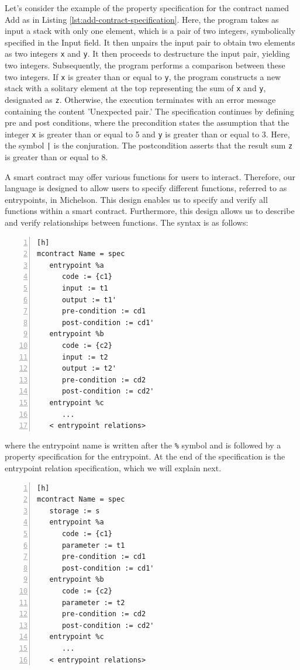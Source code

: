 \documentclass[a4paper,UKenglish,cleveref, autoref, thm-restate]{lipics-v2021}
\begin{document}
Let's consider the  example of the property specification for the contract named Add as in Listing \ref{lst:add-contract-specification}. Here, the program takes as input a stack with only one element, which is a pair of two integers, symbolically specified in the Input field. It then unpairs the input pair to obtain two elements as two integers \lstinline/x/ and \lstinline/y/.  It then proceeds to destructure the input pair, yielding two integers. Subsequently, the program performs a comparison between these two integers. If  \lstinline/x/ is greater than or equal to \lstinline/y/, the program constructs a new stack with a solitary element at the top representing the sum of  \lstinline/x/ and \lstinline/y/, designated as \lstinline/z/. Otherwise, the execution terminates with an error message containing the content 'Unexpected pair.' The specification continues by defining pre and post conditions, where the precondition states the assumption that the integer  \lstinline/x/ is greater than or equal to 5 and \lstinline/y/ is greater than or equal to 3. Here, the symbol  \lstinline/|/ is the conjuration. The postcondition asserts that the result sum \lstinline/z/ is greater than or equal to 8. 

A smart contract may offer various functions for users to interact. Therefore, our language is designed to allow users to specify different functions, referred to as entrypoints, in Michelson. This design enables us to specify and verify all functions within a smart contract. Furthermore, this design allows us to describe and verify relationships between functions.  The syntax is as follows: 
\begin{lstlisting}[float,captionpos=b,caption={Multiple entrypoint specification syntax},label={lst:multiple-entrypoint-specification},numbers=left][h]
mcontract Name = spec
   entrypoint %a 
      code := {c1}
      input := t1
      output := t1'
      pre-condition := cd1
      post-condition := cd1'
   entrypoint %b 
      code := {c2}
      input := t2
      output := t2'
      pre-condition := cd2
      post-condition := cd2'
   entrypoint %c 
      ...
   < entrypoint relations>
\end{lstlisting}
where the entrypoint name is written after the \lstinline/%/ symbol and is followed by a property specification for the entrypoint. At the end of the specification is the entrypoint relation specification, which we will explain next.

\begin{lstlisting}[float,captionpos=b,caption={Multiple entrypoint specification syntax},label={lst:multiple-entrypoint-specification},numbers=left][h]
mcontract Name = spec
   storage := s
   entrypoint %a 
      code := {c1}
      parameter := t1
      pre-condition := cd1
      post-condition := cd1'
   entrypoint %b 
      code := {c2}
      parameter := t2
      pre-condition := cd2
      post-condition := cd2'
   entrypoint %c 
      ...
   < entrypoint relations>
\end{lstlisting}
\end{document}
